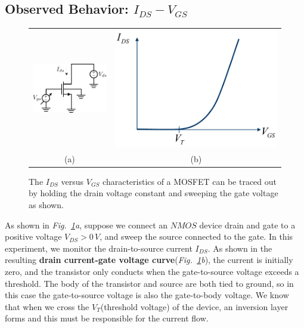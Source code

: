 \subsection{Observed Behavior: \texorpdfstring{$I_{DS}-V_{GS}$}{Drain Current vs. Gate Voltage}}
\begin{figure}[tb]
\centering
\begin{tabular}{cc}
\includegraphics[width=.4\columnwidth]{idvgs_sweep} &
\includegraphics[width=.5\columnwidth]{mos_ids_vgs}\\
(a) & (b)\\
\end{tabular}
\caption{The $I_{DS}$ versus $V_{GS}$ characteristics of a MOSFET can be traced out by holding the drain voltage constant and sweeping the gate voltage as shown.}
\label{fig:idvgs_sweep}
\end{figure}
As shown in \emph{Fig.~\ref{fig:idvgs_sweep}a}, suppose we connect an $NMOS$ device drain and gate to a positive voltage $V_{DS} > 0\,V$, and sweep the source connected to the gate.  In this experiment, we monitor the drain-to-source current $I_{DS}$.  As shown in the resulting \textbf{drain current-gate voltage curve}\big(\emph{Fig.~\ref{fig:idvgs_sweep}b}\big), the current is initially zero, and the transistor only conducts when the gate-to-source voltage exceeds a threshold.  The body of the transistor and source are both tied to ground, so in this case the gate-to-source voltage is also the gate-to-body voltage.  We know that when we cross the $V_T$(threshold voltage) of the device, an inversion layer forms and this must be responsible for the current flow.


